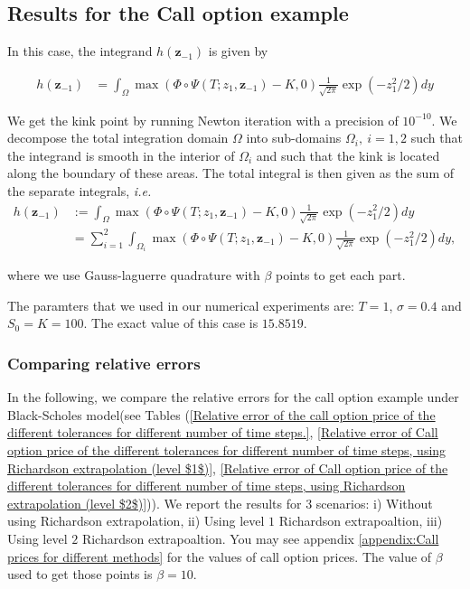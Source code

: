 \documentclass[11pt]{article}
\newcommand{\ie}{\emph{i.e.}}
\begin{document}
\newpage
\subsection{Results for the Call option example}\label{sec:Results for the call option example}


In this case, the integrand $h(\mathbf{z}_{-1})$ is given by

\begin{align}\label{smoothed_integrand_call_opt_2}
	h(\mathbf{z}_{-1})&= \int_{\Omega}  \max \left(\Phi \circ \Psi(T;z_1,\mathbf{z}_{-1})-K,0\right) \frac{1}{\sqrt{2 \pi}} \operatorname{exp}(-z_1^2/2) dy 
\end{align}


We get the kink point by running Newton iteration with a precision of $10^{-10}$. We  decompose the total integration domain $\Omega$  into sub-domains $\Omega_i,\: i=1,2$ such that the
integrand is smooth in the interior of 
$\Omega_i$ and such that the kink is located along the boundary of these areas. The total integral is then given
as the sum of the separate integrals, \ie
\begin{align}
	h(\mathbf{z}_{-1}) &:=  \int_{\Omega} \max \left(\Phi \circ \Psi(T;z_1,\mathbf{z}_{-1})-K,0\right) \frac{1}{\sqrt{2 \pi}} \operatorname{exp}(-z_1^2/2) dy \\ \nonumber
	&=\sum_{i=1}^{2}	\int_{\Omega_i} \max \left(\Phi \circ \Psi(T;z_1,\mathbf{z}_{-1})-K,0\right) \frac{1}{\sqrt{2 \pi}} \operatorname{exp}(-z_1^2/2) dy,
\end{align}


where we use Gauss-laguerre quadrature with $\beta$ points to get each part.

The paramters that we used in our numerical experiments are: $T=1$, $\sigma=0.4$ and $S_0=K=100$. The exact value of this case is $15.8519$.

\subsubsection{Comparing relative errors}
In the following, we compare the  relative errors for the call option example under Black-Scholes model(see Tables (\ref{Relative error of the call option price of the different tolerances for different number of time steps.}, \ref{Relative error of Call option price of the different tolerances for different number of time steps, using Richardson extrapolation (level $1$)}, \ref{Relative error of Call option price of the different tolerances for different number of time steps, using Richardson extrapolation (level $2$)})). We report the results for $3$ scenarios: i) Without using Richardson extrapolation, ii) Using level $1$ Richardson extrapoaltion, iii) Using level $2$ Richardson extrapoaltion.  You may see appendix \ref{appendix:Call prices for different methods} for the values of call option prices. The value of $\beta$ used to get those points is $\beta=10$.
\end{document}
